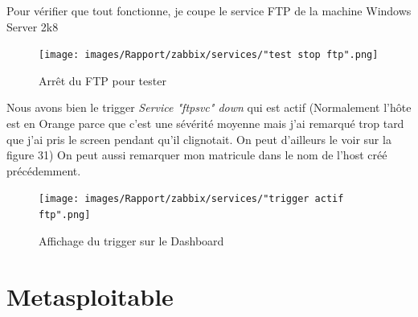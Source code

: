 \documentclass[a4paper]{article}
\begin{document}
Pour vérifier que tout fonctionne, je coupe le service FTP de la machine Windows Server 2k8

\begin{figure}[H]
  \centering
  \texttt{[image: images/Rapport/zabbix/services/"test stop ftp".png]}
  \caption{Arrêt du FTP pour tester}
\end{figure}

Nous avons bien le trigger \emph{Service "ftpsvc" down} qui est actif (Normalement l'hôte est en Orange parce que c'est une sévérité moyenne mais j'ai remarqué trop tard que j'ai pris le screen pendant qu'il clignotait.
On peut d'ailleurs le voir sur la figure 31)
On peut aussi remarquer mon matricule dans le nom de l'host créé précédemment.

\begin{figure}[H]
  \centering
  \texttt{[image: images/Rapport/zabbix/services/"trigger actif ftp".png]}
  \caption{Affichage du trigger sur le Dashboard}
\end{figure}

\newpage
\section{Metasploitable}
\end{document}

